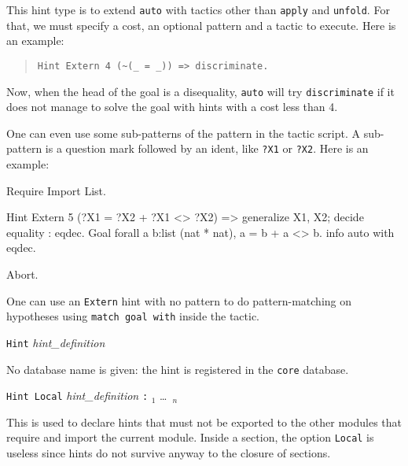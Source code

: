 \begin{coq_example*}
\begin{itemize}
  This hint type is to extend \texttt{auto} with tactics other than
  \texttt{apply} and \texttt{unfold}. For that, we must specify a
  cost, an optional pattern and a tactic to execute. Here is an example:

\begin{quotation}
\begin{verbatim}
Hint Extern 4 (~(_ = _)) => discriminate.
\end{verbatim}
\end{quotation}

  Now, when the head of the goal is a disequality, \texttt{auto} will
  try \texttt{discriminate} if it does not manage to solve the goal
  with hints with a cost less than 4.

  One can even use some sub-patterns of the pattern in the tactic
  script. A sub-pattern is a question mark followed by an ident, like
  \texttt{?X1} or \texttt{?X2}. Here is an example:

\begin{coq_example*}
Require Import List.
\end{coq_example*}
\begin{coq_example}
Hint Extern 5   ({?X1 = ?X2} + {?X1 <> ?X2}) =>
 generalize X1, X2; decide equality : eqdec.
Goal
forall a b:list (nat * nat), {a = b} + {a <> b}.
info auto with eqdec.
\end{coq_example}
\begin{coq_eval}
Abort.
\end{coq_eval}

\end{itemize}

\Rem One can use an \texttt{Extern} hint with no pattern to do
pattern-matching on hypotheses using \texttt{match goal with} inside
the tactic.

\begin{Variants}
\item \texttt{Hint} \textsl{hint\_definition}

  No database name is given: the hint is registered in the {\tt core}
    database.

\item\texttt{Hint Local} \textsl{hint\_definition} \texttt{:}
   \ident$_1$ \ldots\ \ident$_n$

  This is used to declare hints that must not be exported to the other
  modules that require and import the current module. Inside a
  section, the option {\tt Local} is useless since hints do not
  survive anyway to the closure of sections.


\end{Variants}
\end{coq_example*}
